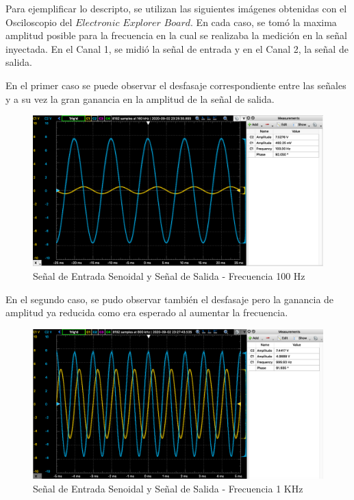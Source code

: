 Para ejemplificar lo descripto, se utilizan las siguientes imágenes obtenidas con el Osciloscopio del $Electronic$ $Explorer$ $Board$. En cada caso, se tomó 
la maxima amplitud posible para la frecuencia en la cual se realizaba la medición en la señal inyectada. En el Canal 1, se midió la señal de entrada y en el Canal 2, 
la señal de salida.

En el primer caso se puede observar el desfasaje correspondiente entre las señales y a su vez la gran ganancia en la amplitud de la señal de salida.

\begin{figure}[H]
    \centering 
    \includegraphics [scale=0.4] {../Ejercicio3-CircuitoIntegradoresyDerivadores/Imagenes/senoidal - 100.png} 
    \caption{Señal de Entrada Senoidal y Señal de Salida - Frecuencia 100 Hz}
    \label{fig:emptyPlotTool}
\end{figure}

En el segundo caso, se pudo observar también el desfasaje pero la ganancia de amplitud ya reducida como era esperado al aumentar la frecuencia.

\begin{figure}[H]
    \centering 
    \includegraphics [scale=0.4] {../Ejercicio3-CircuitoIntegradoresyDerivadores/Imagenes/senoidal - 1000.png} 
    \caption{Señal de Entrada Senoidal y Señal de Salida - Frecuencia 1 KHz }
    \label{fig:emptyPlotTool}
\end{figure}


